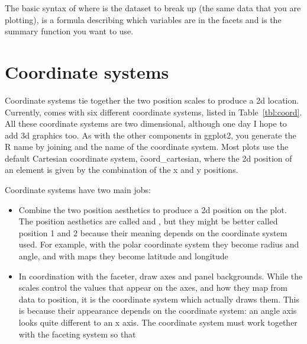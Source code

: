 The basic syntax of  where  is the dataset to break up (the same data that you are plotting),  is a formula describing which variables are in the facets and  is the summary function you want to use. 



\section{Coordinate systems}
\label{sec:coord}

Coordinate systems tie together the two position scales to produce a 2d location. Currently, \ggplot comes with six different coordinate systems, listed in Table~\ref{tbl:coord}.  All these coordinate systems are two dimensional, although one day I hope to add 3d graphics too. As with the other components in ggplot2, you generate the R name by joining  and the name of the coordinate system.  Most plots use the default Cartesian coordinate system, \f{coord_cartesian}, where the 2d position of an element is given by the combination of the x and y positions.  

Coordinate systems have two main jobs: 

\begin{itemize}
  \item Combine the two position aesthetics to produce a 2d position on the plot.  The position aesthetics are called  and , but they might be better called position 1 and 2 because their meaning depends on the coordinate system used.  For example, with the polar coordinate system they become radius and angle, and with maps they become latitude and longitude
  
  \item In coordination with the faceter, draw axes and panel backgrounds.  While the scales control the values that appear on the axes, and how they map from data to position, it is the coordinate system which actually draws them.  This is because their appearance depends on the coordinate system: an angle axis looks quite different to an x axis.  The coordinate system must work together with the faceting system so that 

\end{itemize}


